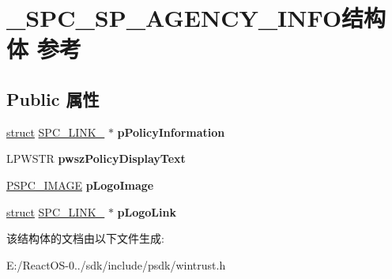 \hypertarget{struct___s_p_c___s_p___a_g_e_n_c_y___i_n_f_o}{}\section{\+\_\+\+S\+P\+C\+\_\+\+S\+P\+\_\+\+A\+G\+E\+N\+C\+Y\+\_\+\+I\+N\+F\+O结构体 参考}
\label{struct___s_p_c___s_p___a_g_e_n_c_y___i_n_f_o}
\subsection*{Public 属性}
\begin{DoxyCompactItemize}
\item 
\mbox{\label{struct___s_p_c___s_p___a_g_e_n_c_y___i_n_f_o_af259b940344358c806977903f7e8723e}} 
\hyperlink{interfacestruct}{struct} \hyperlink{struct_s_p_c___l_i_n_k__}{S\+P\+C\+\_\+\+L\+I\+N\+K\+\_\+} $\ast$ {\bfseries p\+Policy\+Information}
\item 
\mbox{\label{struct___s_p_c___s_p___a_g_e_n_c_y___i_n_f_o_a6c4d1d38d606c96b40da6a7ccec1b1cc}} 
L\+P\+W\+S\+TR {\bfseries pwsz\+Policy\+Display\+Text}
\item 
\mbox{\label{struct___s_p_c___s_p___a_g_e_n_c_y___i_n_f_o_a62ef33c6a000a350ba1f96b46cedb280}} 
\hyperlink{struct___s_p_c___i_m_a_g_e}{P\+S\+P\+C\+\_\+\+I\+M\+A\+GE} {\bfseries p\+Logo\+Image}
\item 
\mbox{\label{struct___s_p_c___s_p___a_g_e_n_c_y___i_n_f_o_aac47a7e02ebf829386e4d8423a9a486a}} 
\hyperlink{interfacestruct}{struct} \hyperlink{struct_s_p_c___l_i_n_k__}{S\+P\+C\+\_\+\+L\+I\+N\+K\+\_\+} $\ast$ {\bfseries p\+Logo\+Link}
\end{DoxyCompactItemize}


该结构体的文档由以下文件生成\+:\begin{DoxyCompactItemize}
\item 
E\+:/\+React\+O\+S-\/0../sdk/include/psdk/wintrust.\+h\end{DoxyCompactItemize}
